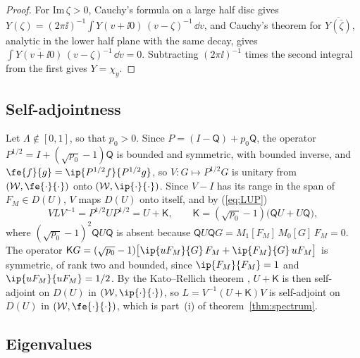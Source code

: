\begin{proof}
For $\mathrm{Im}\,\zeta>0$, Cauchy's formula on a large half disc gives $Y(\zeta)=(2\pi\ii)^{-1}\int Y(v+\ii0)\,(v-\zeta)^{-1}\,\dd v$, and Cauchy's theorem for $\overline{Y(\bar\zeta)}$, analytic in the lower half plane with the same decay, gives $\int\overline{Y(v+\ii0)}\,(v-\zeta)^{-1}\,\dd v=0$. Subtracting $(2\pi\ii)^{-1}$ times the second integral from the first gives $Y=\chi_y$.
\end{proof}

\subsection{Self-adjointness}\label{appB:sa}

Let $\Lambda\notin[0,1]$, so that $p_0>0$. Since $P=(I-\mathsf Q)+p_0\mathsf Q$, the operator $P^{1/2}=I+(\sqrt{p_0}-1)\mathsf Q$ is bounded and symmetric, with bounded inverse, and $\fe{f}{g}=\ip{P^{1/2}f}{P^{1/2}g}$, so $V:G\mapsto P^{1/2}G$ is unitary from $(\mathcal W,\fe{\cdot}{\cdot})$ onto $(\mathcal W,\ip{\cdot}{\cdot})$. Since $V-I$ has its range in the span of $F_M\in D(U)$, $V$ maps $D(U)$ onto itself, and by (\ref{eq:LUP})
\begin{equation}\label{appB:rank2}
  VLV^{-1}=P^{1/2}UP^{1/2}=U+\mathsf K,\qquad
  \mathsf K=(\sqrt{p_0}-1)\big(\mathsf QU+U\mathsf Q\big),
\end{equation}
where $(\sqrt{p_0}-1)^2\mathsf QU\mathsf Q$ is absent because $\mathsf QU\mathsf QG=M_1[F_M]\,M_0[G]\,F_M=0$. The operator $\mathsf KG=(\sqrt{p_0}-1)\big[\ip{uF_M}{G}\,F_M+\ip{F_M}{G}\,uF_M\big]$ is symmetric, of rank two and bounded, since $\ip{F_M}{F_M}=1$ and $\ip{uF_M}{uF_M}=1/2$. By the Kato--Rellich theorem \citep[][chapter~V]{Kato1966}, $U+\mathsf K$ is then self-adjoint on $D(U)$ in $(\mathcal W,\ip{\cdot}{\cdot})$, so $L=V^{-1}(U+\mathsf K)V$ is self-adjoint on $D(U)$ in $(\mathcal W,\fe{\cdot}{\cdot})$, which is part~(i) of theorem~\ref{thm:spectrum}.

\subsection{Eigenvalues}\label{appB:eig}

